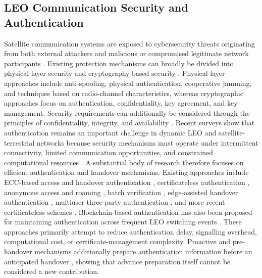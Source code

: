 \documentclass[conference]{IEEEtran}
\begin{document}
\subsection{LEO Communication Security and Authentication}
Satellite communication systems are exposed to cybersecurity threats originating from both external attackers and malicious or compromised legitimate network participants \cite{ref1}. Existing protection mechanisms can broadly be divided into physical-layer security and cryptography-based security \cite{ref1,ref2}. Physical-layer approaches include anti-spoofing, physical authentication, cooperative jamming, and techniques based on radio-channel characteristics, whereas cryptographic approaches focus on authentication, confidentiality, key agreement, and key management. Security requirements can additionally be considered through the principles of confidentiality, integrity, and availability \cite{ref3}. Recent surveys show that authentication remains an important challenge in dynamic LEO and satellite-terrestrial networks because security mechanisms must operate under intermittent connectivity, limited communication opportunities, and constrained computational resources \cite{ref4,ref5}. 
A substantial body of research therefore focuses on efficient authentication and handover mechanisms. Existing approaches include ECC-based access and handover authentication \cite{ref6}, certificateless authentication \cite{ref7}, anonymous access and roaming \cite{ref8}, batch verification \cite{ref9}, edge-assisted handover authentication \cite{ref10}, multiuser three-party authentication \cite{ref11}, and more recent certificateless schemes \cite{ref12}. Blockchain-based authentication has also been proposed for maintaining authentication across frequent LEO switching events \cite{ref13}. These approaches primarily attempt to reduce authentication delay, signalling overhead, computational cost, or certificate-management complexity. Proactive and pre-handover mechanisms additionally prepare authentication information before an anticipated handover \cite{ref14}, showing that advance preparation itself cannot be considered a new contribution.
\end{document}
